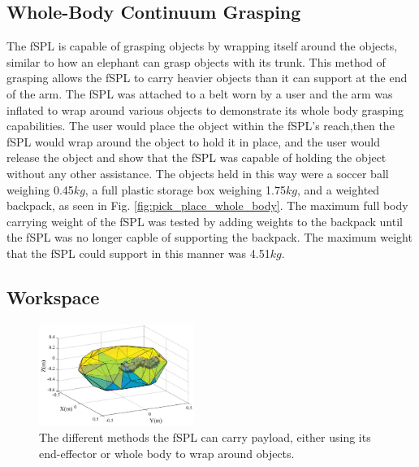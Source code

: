 \documentclass[letterpaper, 10 pt, conference]{ieeeconf}  %
\begin{document}




\subsection{Whole-Body Continuum Grasping}


The fSPL is capable of grasping objects by wrapping itself around the objects, similar to how an elephant can grasp objects with its trunk. This method of grasping allows the fSPL to carry heavier objects than it can support at the end of the arm. The fSPL was attached to a belt worn by a user and the arm was inflated to wrap around various objects to demonstrate its whole body grasping capabilities. The user would place the object within the fSPL's reach,then the fSPL would wrap around the object to hold it in place, and the user would release the object and show that the fSPL was capable of holding the object without any other assistance. The objects held in this way were a soccer ball weighing 0.45$kg$, a full plastic storage box weighing 1.75$kg$, and a weighted backpack, as seen in Fig. \ref{fig:pick_place_whole_body}. The maximum full body carrying weight of the fSPL was tested by adding weights to the backpack until the fSPL was no longer capble of supporting the backpack. The maximum weight that the fSPL could support in this manner was 4.51$kg$.


\subsection{Workspace}
\begin{figure}[t!]
\centering
\includegraphics[width=0.45\textwidth]{Figures/Workspace_Fabric_ARM}
\caption{The different methods the fSPL can carry payload, either using its end-effector or whole body to wrap around objects.}
\label{fig:workspace_fabric_arm}
\vspace{-1.5em}
\end{figure}
\end{document}
